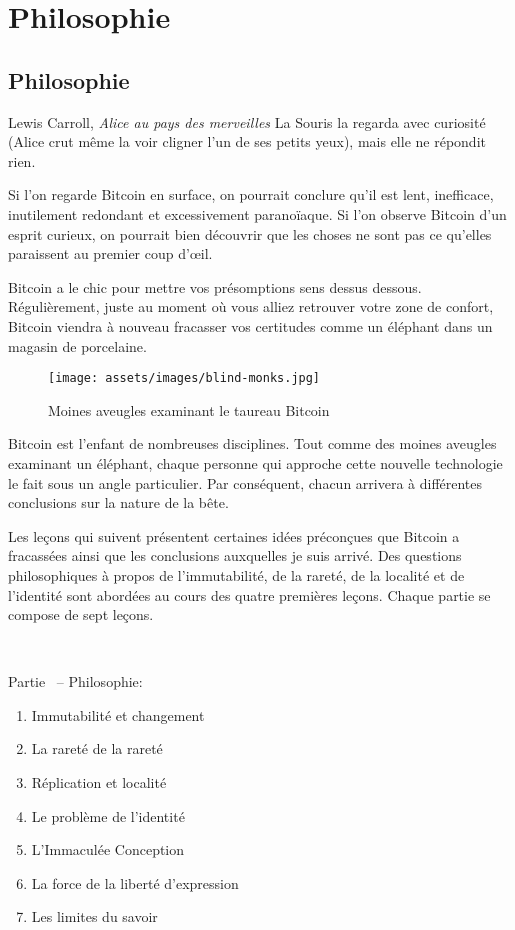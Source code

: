 \part{Philosophie}
\label{ch:philosophy}
\chapter*{Philosophie}

\begin{chapquote}{Lewis Carroll, \textit{Alice au pays des merveilles}}
  La Souris la regarda avec curiosité (Alice crut même la voir cligner l’un de
  ses petits yeux), mais elle ne répondit rien.
\end{chapquote}

Si l'on regarde Bitcoin en surface, on pourrait conclure qu'il est lent,
inefficace, inutilement redondant et excessivement paranoïaque. Si l'on observe
Bitcoin d'un esprit curieux, on pourrait bien découvrir que les choses ne sont
pas ce qu'elles paraissent au premier coup d'œil.

Bitcoin a le chic pour mettre vos présomptions sens dessus dessous.
Régulièrement, juste au moment où vous alliez retrouver votre zone de confort,
Bitcoin viendra à nouveau fracasser vos certitudes comme un éléphant dans un
magasin de porcelaine.

\begin{figure}
  \texttt{[image: assets/images/blind-monks.jpg]}
  \caption{Moines aveugles examinant le taureau Bitcoin}
  \label{fig:blind-monks}
\end{figure}

Bitcoin est l'enfant de nombreuses disciplines. Tout comme des moines aveugles
examinant un éléphant, chaque personne qui approche cette nouvelle technologie
le fait sous un angle particulier. Par conséquent, chacun arrivera à différentes
conclusions sur la nature de la bête.

Les leçons qui suivent présentent certaines idées préconçues que Bitcoin a
fracassées ainsi que les conclusions auxquelles je suis arrivé. Des questions
philosophiques à propos de l'immutabilité, de la rareté, de la localité et de
l'identité sont abordées au cours des quatre premières leçons. Chaque partie se
compose de sept leçons.

~

\begin{samepage}
Partie~\ref{ch:philosophy} -- Philosophie:

\begin{enumerate}
  \item Immutabilité et changement
  \item La rareté de la rareté
  \item Réplication et localité
  \item Le problème de l'identité
  \item L'Immaculée Conception
  \item La force de la liberté d'expression
  \item Les limites du savoir
\end{enumerate}
\end{samepage}

